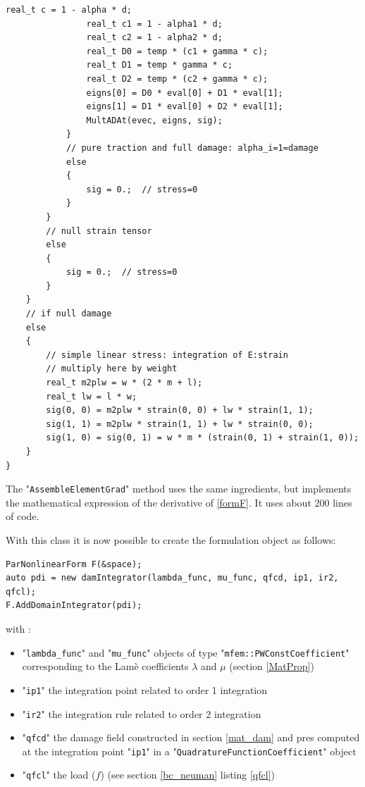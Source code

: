 \documentclass[12pt]{article}
\newcommand{\mycode}[1]{\textsf{"}\lstinline`#1`\textsf{"}}
\begin{document}
\begin{lstlisting}[basicstyle=\scriptsize,label=asymstress]
				real_t c = 1 - alpha * d;
				real_t c1 = 1 - alpha1 * d;
				real_t c2 = 1 - alpha2 * d;
				real_t D0 = temp * (c1 + gamma * c);
				real_t D1 = temp * gamma * c;
				real_t D2 = temp * (c2 + gamma * c);
				eigns[0] = D0 * eval[0] + D1 * eval[1];
				eigns[1] = D1 * eval[0] + D2 * eval[1];
				MultADAt(evec, eigns, sig);
			}
			// pure traction and full damage: alpha_i=1=damage
			else
			{
				sig = 0.;  // stress=0 
			}
		}
		// null strain tensor
		else
		{
			sig = 0.;  // stress=0
		}
	}
	// if null damage
	else
	{
		// simple linear stress: integration of E:strain
		// multiply here by weight
		real_t m2plw = w * (2 * m + l);
		real_t lw = l * w;
		sig(0, 0) = m2plw * strain(0, 0) + lw * strain(1, 1);
		sig(1, 1) = m2plw * strain(1, 1) + lw * strain(0, 0);
		sig(1, 0) = sig(0, 1) = w * m * (strain(0, 1) + strain(1, 0));
	}	
}
\end{lstlisting}

The \mycode{AssembleElementGrad} method uses the same ingredients, but implements the mathematical expression of the derivative of \eqref{formF}. It uses about 200 lines of code.

With this class it is now possible to create the formulation object as follows:
\begin{lstlisting}[numbers=none,basicstyle=\scriptsize,label=mfem::nlform]
ParNonlinearForm F(&space);
auto pdi = new damIntegrator(lambda_func, mu_func, qfcd, ip1, ir2, qfcl);
F.AddDomainIntegrator(pdi);
\end{lstlisting}
with :
\begin{itemize}
	\item \mycode{lambda_func} and \mycode{mu_func} objects of type \mycode{mfem::PWConstCoefficient} corresponding to the Lamè coefficients $\lambda$ and $\mu$ (section \ref{MatProp})
	\item \mycode{ip1} the integration point related to order 1 integration
	\item \mycode{ir2} the integration rule related to order 2 integration
	\item \mycode{qfcd} the damage field constructed in section \ref{mat_dam} and pres computed at the integration point \mycode{ip1} in a \mycode{QuadratureFunctionCoefficient} object
	\item  \mycode{qfcl} the load ($f$) (see section \ref{bc_neuman} listing \ref{qfcl})
\end{itemize}
\end{document}
